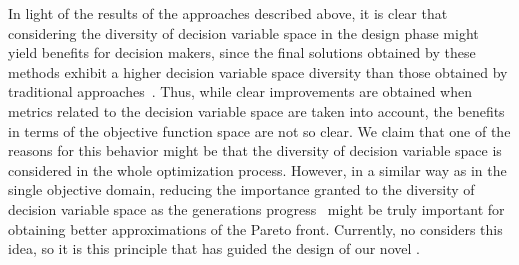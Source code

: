 In light of the results of the approaches described above, it is clear that considering the diversity of decision variable space
in the design phase might yield benefits for decision makers, since the final solutions obtained by these 
methods exhibit a higher decision variable space diversity than those obtained by traditional 
approaches~\cite{deb2005omni, rudolph2007capabilities}.
%
Thus, while clear improvements are obtained when metrics related to the decision 
variable space are taken into account, the benefits in terms of the 
objective function space are not so clear.
%
We claim that one of the reasons for this behavior might be that the diversity of decision variable space is considered 
in the whole optimization process.
%
However, in a similar way as in the single objective domain, reducing the importance granted to the diversity 
of decision variable space as the generations progress~\cite{Joel:MULTI_DYNAMIC} might be truly important for obtaining
better approximations of the Pareto front.
%
Currently, no \MOEA{} considers this idea, so it is this principle that has guided the design of our novel \MOEA{}.


